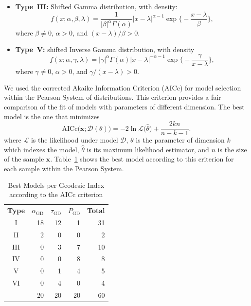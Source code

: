\documentclass[journal]{IEEEtran}
\begin{document}
{\begin{itemize}
\begin{itemize}
\item \textbf{Type~III:} Shifted Gamma distribution, with density:
$$
f(x; \alpha, \beta, \lambda)=
\frac{1}{|\beta|^\alpha \Gamma(\alpha)}
\big|x-\lambda\big|^{\alpha-1}
\exp\Big\{
-\frac{x-\lambda}{\beta}
\Big\},
$$
where $\beta\neq0$, $\alpha>0$, and $(x-\lambda)/\beta>0$.

		\item \textbf{Type~V:} shifted Inverse Gamma distribution, with density
$$
f(x;\alpha,\gamma,\lambda)= |\gamma|^\alpha \Gamma(\alpha) \big|x-\lambda\big|^{-\alpha-1} \exp\Big\{-\frac{\gamma}{x-\lambda} \Big\} ,
$$
where $\gamma\neq 0$, $\alpha>0$, and $\gamma/(x-\lambda)>0$.
\end{itemize}
\end{itemize}

We used the corrected Akaike Information Criterion (AICc) for model selection within the Pearson System of distributions.
This criterion provides a fair comparison of the fit of models with parameters of different dimension.
The best model is the one that minimizes
$$
\text{AICc}\big({\bm x; \mathcal D(\theta)}\big) =  -2 \ln \mathcal L\big(\widehat\theta\big) +  \frac{2 k n} {n-k-1}.
$$
where $\mathcal L$ is the likelihood under model $\mathcal D$,
$\theta$ is the parameter of dimension $k$ which indexes the model, $\widehat\theta$ is its maximum likelihood estimator,
and $n$ is the size of the sample $\bm x$.
Table~\ref{Tab:BestModelGeodesicIndex} shows the best model according to this criterion for each sample within the Pearson System.

\begin{table}[hbt]
	\centering
	\caption{Best Models per Geodesic Index according to the AICc criterion}\label{Tab:BestModelGeodesicIndex}
	\begin{tabular}{crrrr}
		\toprule
		\textbf{Type}
		& $\alpha_{\text{GD}}$
		& $\tau_{\text{GD}}$
		& $P_{\text{GD}}$ 
		& \textbf{Total}\\
		\cmidrule(lr){1-1}
		\cmidrule(lr){2-4}
		\cmidrule(lr){5-5}
		I	&18 &12 &1 	&31 \\
		II	&2 	&0 &0 	&2 \\
		III	&0 	&3 &7 	&10 \\
		IV	&0 	&0 &8 	&8 \\
		V	&0 	&1 &4 	&5 \\
		VI 	&0 	&4 &0 	&4 \\
		\cmidrule(lr){2-4} \cmidrule(lr){5-5}
			&20 &20 &20 & 60 \\
		\bottomrule
	\end{tabular}
\end{table}

}
\end{document}
